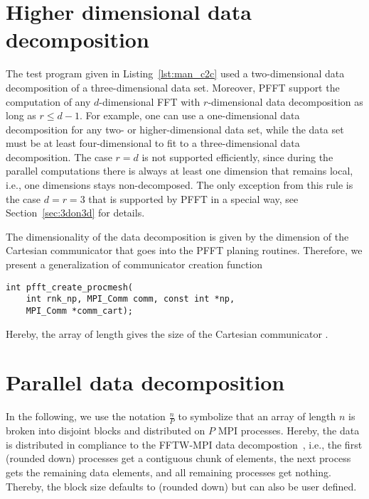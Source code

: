 \section{Higher dimensional data decomposition}
The test program given in Listing~\ref{lst:man_c2c} used a two-dimensional data decomposition of a three-dimensional data set.
Moreover, PFFT support the computation of any $d$-dimensional FFT with $r$-dimensional data decomposition
as long as $r\le d-1$. For example, one can use a one-dimensional data decomposition for any two- or higher-dimensional data set,
while the data set must be at least four-dimensional to fit to a three-dimensional data decomposition.
The case $r=d$ is not supported efficiently, since during the parallel computations
there is always at least one dimension that remains local, i.e., one dimensions stays non-decomposed.
The only exception from this rule is the case $d=r=3$ that is supported by PFFT in a special way, see Section~\ref{sec:3don3d} for details.

The dimensionality of the data decomposition is given by the dimension of the Cartesian communicator that
goes into the PFFT planing routines. Therefore, we present a generalization of communicator creation function
\begin{lstlisting}
int pfft_create_procmesh(
    int rnk_np, MPI_Comm comm, const int *np,
    MPI_Comm *comm_cart);
\end{lstlisting}
Hereby, the array  of length  gives the size of the Cartesian communicator .

\section{Parallel data decomposition}\label{sec:par-data-decomp}
In the following, we use the notation $\frac{n}{P}$ to symbolize that an array of length $n$ is broken into disjoint blocks and distributed on $P$ MPI processes.
Hereby, the data is distributed in compliance to the FFTW-MPI data decompostion~\cite{fftw-mpi-data-distribution},
i.e., the first  (rounded down) processes get a contiguous chunk of  elements,
the next process gets the remaining  data elements, and all remaining processes get nothing.
Thereby, the block size  defaults to  (rounded down) but can also be user defined.

